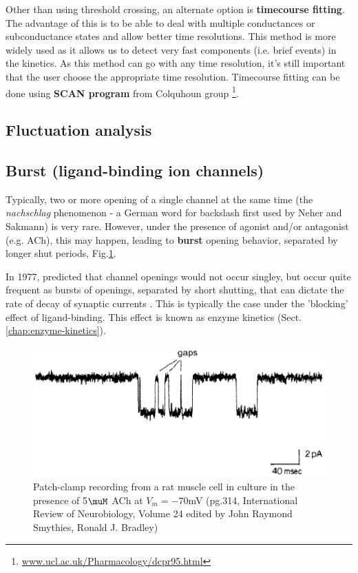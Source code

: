Other than using threshold crossing, an alternate option is {\bf timecourse
fitting}. The advantage of this is to be able to deal with multiple conductances
or subconductance states and allow better time resolutions. This method is more
widely used as it allows us to detect very fast components (i.e. brief events)
in the kinetics. As this method can go with any time resolution, it's still
important that the user choose the appropriate time resolution. Timecourse
fitting can be done using {\bf SCAN program} from Colquhoun group
\footnote{\url{www.ucl.ac.uk/Pharmacology/dcpr95.html}}.


\subsection{Fluctuation analysis}
\label{sec:fluctuation-analysis}

\citep{alvarez2002}

\subsection{Burst (ligand-binding ion channels)}
\label{sec:bursts}

Typically, two or more opening of a single channel at the same time (the {\it
nachschlag} phenomenon - a German word for backslash first used by Neher and
Sakmann) is very rare. However, under the presence of agonist and/or antagonist
(e.g. ACh), this may happen, leading to {\bf burst} opening behavior, separated
by longer shut periods, Fig.\ref{fig:gap_burst}.

In 1977, \citep{colquhoun1977rfm} predicted  that channel openings would not
occur singley, but occur quite frequent as bursts of openings, separated by
short shutting, that can dictate the rate of decay of synaptic currents
\citep{colquhoun1985fes}. This is typically the case under the 'blocking' effect
of ligand-binding. This effect is known as enzyme kinetics
(Sect.\ref{chap:enzyme-kinetics}).

\begin{figure}[htb]
  \centerline{\includegraphics[height=5cm]{./images/gap_burst.eps}}
  \caption{Patch-clamp recording from a rat muscle cell in culture in the
  presence of 5$\muM$ ACh at $V_m=-70$mV (pg.314, International Review of
Neurobiology, Volume 24 edited by John Raymond Smythies, Ronald J. Bradley)}
\label{fig:gap_burst}
\end{figure}

